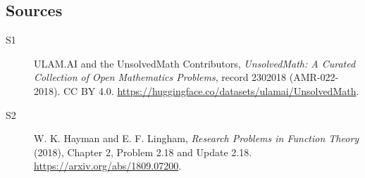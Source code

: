 \documentclass[11pt]{article}
\begin{document}
\subsection{Sources}
\begin{description}
\item[\hypertarget{source:2302018:1}{S1}] ULAM.AI and the UnsolvedMath Contributors, \emph{UnsolvedMath: A Curated Collection of Open Mathematics Problems}, record 2302018 (AMR-022-2018). CC BY 4.0. \url{https://huggingface.co/datasets/ulamai/UnsolvedMath}.
\item[\hypertarget{source:2302018:2}{S2}] W. K. Hayman and E. F. Lingham, \emph{Research Problems in Function Theory} (2018), Chapter 2, Problem 2.18 and Update 2.18. \url{https://arxiv.org/abs/1809.07200}.
\end{description}
\label{end:2302018}
\end{document}
